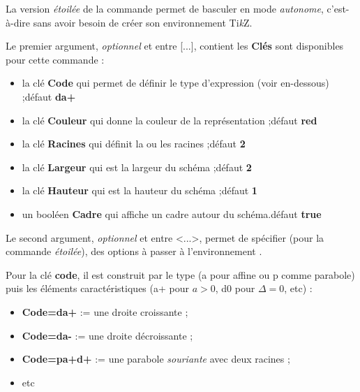 \documentclass[a4paper,french,11pt]{article}
\providecommand\tikzlogo{Ti\textit{k}Z}
\let\TikZ\tikzlogo
\newcommand\ctex[1]{\tcbox[vignettelatex]{#1}}
\newcommand\cmaj[1]{%
	{\tcbox[vignetteMaJ]{#1}\xspace}%
}
\newcommand\Cle[1]{{\bfseries\sffamily\textlangle \textcolor{orange!75!black}{#1}\textrangle}}
\begin{document}
\begin{cautionblock}
\cmaj{2.1.9} La version \textit{étoilée} de la commande permet de basculer en mode \textit{autonome}, c'est-à-dire sans avoir besoin de créer son environnement \TikZ.

\smallskip

Le premier argument, \textit{optionnel} et entre \textsf{[...]}, contient les \Cle{Clés} sont disponibles pour cette commande :

\begin{itemize}
	\item la clé \Cle{Code} qui permet de définir le type d'expression (voir en-dessous) ;\hfill{}défaut \Cle{da+}
	\item la clé \Cle{Couleur} qui donne la couleur de la représentation ;\hfill{}défaut \Cle{red}
	\item la clé \Cle{Racines} qui définit la ou les racines ;\hfill{}défaut \Cle{2}
	\item la clé \Cle{Largeur} qui est la largeur du schéma ;\hfill{}défaut \Cle{2}
	\item la clé \Cle{Hauteur} qui est la hauteur du schéma ;\hfill{}défaut \Cle{1}
	\item un booléen \Cle{Cadre} qui affiche un cadre autour du schéma.\hfill{}défaut \Cle{true}
\end{itemize}

Le second argument, \textit{optionnel} et entre \textsf{<...>}, permet de spécifier (pour la commande \textit{étoilée}), des options à passer à l'environnement \ctex{tikzpicture}.
\end{cautionblock}

\begin{cautionblock}
Pour la clé \Cle{code}, il est construit par le type (\textsf{a} pour affine ou \textsf{p} comme parabole) puis les éléments caractéristiques (\textsf{a+} pour $a>0$, \textsf{d0} pour $\Delta=0$, etc) :

\begin{itemize}
	\item \Cle{Code=da+} := une droite croissante ;
	\item \Cle{Code=da-} := une droite décroissante ;
	\item \Cle{Code=pa+d+} := une parabole \textit{souriante} avec deux racines ;
	\item etc
\end{itemize}
\vspace*{-\baselineskip}\leavevmode
\end{cautionblock}
\end{document}
